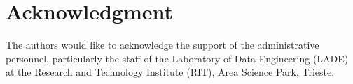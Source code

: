 \section*{Acknowledgment}
The authors would like to acknowledge the support of the administrative
personnel, particularly the staff of the Laboratory of Data Engineering
(LADE) at the Research and Technology Institute (RIT), Area Science Park,
Trieste. 






